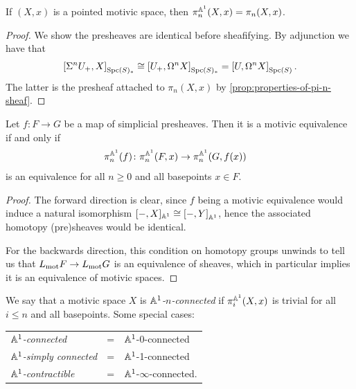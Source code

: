 \documentclass[11pt,openany]{book}
\begin{document}
\begin{proposition} If $(X,x)$ is a pointed motivic space, then $\pi_n^{\mathbb{A}^1}(X,x) = \pi_n(X,x)$.
\end{proposition}
\begin{proof} We show the presheaves are identical before sheafifying. By adjunction we have that
\begin{align*}
    \left[ \Sigma^n U_+, X \right]_{\mathrm{Spc}(S)_\ast} \cong \left[ U_+, \Omega^n X \right]_{\mathrm{Spc}(S)_\ast} = \left[ U, \Omega^n X \right]_{\mathrm{Spc}(S)}.
\end{align*}
The latter is the presheaf attached to $\pi_n(X,x)$ by \autoref{prop:properties-of-pi-n-sheaf}.
\end{proof}

\begin{proposition}\label{prop:motivic-equiv-can-be-checked-on-htpy-sheaves} 
Let $f\colon F\to G$ be a map of simplicial presheaves. Then it is a motivic equivalence if and only if
\begin{align*}
    \pi_n^{\mathbb{A}^1}(f) \colon \pi_n^{\mathbb{A}^1}(F,x) &\to \pi_n^{\mathbb{A}^1}(G,f(x))
\end{align*}
is an equivalence for all $n\ge0$ and all basepoints $x\in F$.
\end{proposition}
\begin{proof} The forward direction is clear, since $f$ being a motivic equivalence would induce a natural isomorphism $[-,X]_{\mathbb{A}^1} \cong \left[ -,Y \right]_{\mathbb{A}^1}$, hence the associated homotopy (pre)sheaves would be identical.

For the backwards direction, this condition on homotopy groups unwinds to tell us that $L_{\mathrm{mot}} F \to L_{\mathrm{mot}} G$ is an equivalence of sheaves, which in particular implies it is an equivalence of motivic spaces.
\end{proof}

\begin{terminology} We say that a motivic space $X$ is $\mathbb{A}^1$\textit{-$n$-connected} if $\pi_i^{\mathbb{A}^1}(X,x)$ is trivial for all $i\le n$ and all basepoints. Some special cases:
\begin{center}
    \begin{tabular}{l l l}
    $\mathbb{A}^1$\textit{-connected} &= & $\mathbb{A}^1$-0-connected \\
    $\mathbb{A}^1$\textit{-simply connected} &= & $\mathbb{A}^1$-1-connected \\
    $\mathbb{A}^1$\textit{-contractible} &= & $\mathbb{A}^1$-$\infty$-connected.
    \end{tabular}
\end{center}
\end{terminology}
\end{document}
